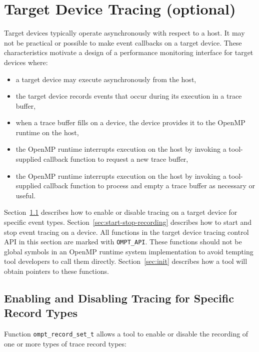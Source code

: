 \documentclass{article}
\begin{document}
\section{Target Device Tracing (optional)}
\label{sec:target-device-records}

Target devices typically operate asynchronously with respect to a host. It may not be practical or possible to make event callbacks on a target device. These characteristics motivate a design of a performance monitoring interface for target devices where: 
\begin{itemize}
\item a target device may execute asynchronously from the host,
\item the target device records events that occur during its execution in a trace buffer,
\item when a trace buffer fills on a device,  the device provides it to the OpenMP runtime  on the host,
\item the OpenMP runtime  interrupts execution on the host by invoking a tool-supplied callback function to request a new trace buffer,
\item the OpenMP runtime  interrupts execution on the host by invoking a tool-supplied callback function to process and empty a trace buffer as necessary or useful.
\end{itemize}


 Section~\ref{sec:trace-event}  describes how to enable or disable tracing on a target device for specific event types. Section~\ref{sec:start-stop-recording} describes how to start and stop event tracing on a device. All functions in the target device tracing control API in this section are marked with \verb|OMPT_API|. These functions should not be global symbols in an OpenMP runtime system implementation to avoid tempting tool developers to call them directly. Section~\ref{sec:init} describes how a tool will obtain pointers to these functions.


\subsection{Enabling and Disabling Tracing for Specific Record Types}
\label{sec:trace-event}
Function \verb|ompt_record_set_t| allows a tool to enable or disable the recording of one or more types of trace record types:
\end{document}
